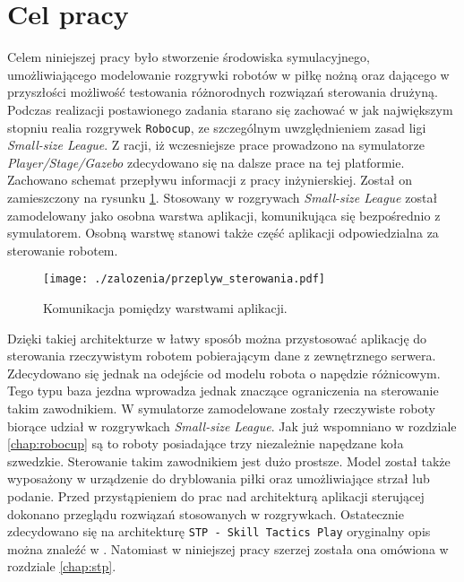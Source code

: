 \section{Cel pracy}
Celem niniejszej pracy było stworzenie środowiska symulacyjnego, umożliwiającego modelowanie rozgrywki robotów w piłkę nożną oraz 
dającego w przyszłości możliwość testowania różnorodnych rozwiązań sterowania drużyną.
Podczas realizacji postawionego zadania starano się zachować w jak największym stopniu realia rozgrywek \texttt{Robocup}, ze szczególnym uwzględnieniem zasad ligi \emph{Small-size League}.
Z racji, iż wczesniejsze prace prowadzono na symulatorze \emph{Player/Stage/Gazebo} zdecydowano się na dalsze prace na tej platformie.
Zachowano schemat przepływu informacji z pracy inżynierskiej. Został on zamieszczony na rysunku \ref{fig:przeplyw_sterowania}. Stosowany w rozgrywach \emph{Small-size League} został
zamodelowany jako osobna warstwa  aplikacji, komunikująca się bezpośrednio z symulatorem. Osobną warstwę stanowi także część aplikacji odpowiedzialna za sterowanie robotem.
\begin{figure}[H]
\centering
\texttt{[image: ./zalozenia/przeplyw\_sterowania.pdf]}
\caption{Komunikacja pomiędzy warstwami aplikacji.} \label{fig:przeplyw_sterowania}
\end{figure}
Dzięki takiej architekturze w łatwy sposób można przystosować aplikację do sterowania rzeczywistym robotem pobierającym dane z zewnętrznego serwera.
Zdecydowano się jednak na odejście od modelu robota o napędzie różnicowym. Tego typu baza jezdna wprowadza jednak znaczące ograniczenia na sterowanie takim zawodnikiem. W symulatorze zamodelowane zostały rzeczywiste
roboty biorące udział w rozgrywkach \emph{Small-size League}. Jak już wspomniano w rozdziale \ref{chap:robocup} są to roboty posiadające trzy niezależnie napędzane koła szwedzkie. Sterowanie takim zawodnikiem jest dużo
prostsze. Model został także wyposażony w urządzenie do dryblowania piłki oraz umożliwiające strzał lub podanie.
Przed przystąpieniem do prac nad architekturą aplikacji sterującej dokonano przeglądu rozwiązań stosowanych w rozgrywkach. Ostatecznie zdecydowano się na architekturę 
\mbox{\texttt{STP - Skill Tactics Play}} oryginalny opis można znaleźć w \cite{stp}. Natomiast w niniejszej pracy szerzej została ona omówiona w rozdziale \ref{chap:stp}.

